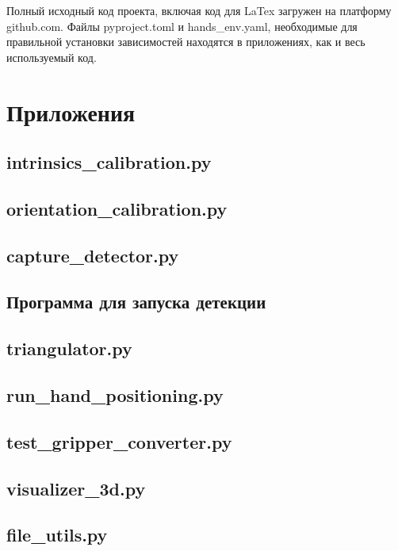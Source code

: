\documentclass[12pt, a4paper]{article}
\begin{document}
Полный исходный код проекта, включая код для LaTex загружен на платформу
github.com\cite{mycode-github}. Файлы pyproject.toml и hands\_env.yaml,
необходимые для правильной установки зависимостей находятся в приложениях, как
и весь используемый код.

\section{Приложения}
\subsection{intrinsics\_calibration.py}



\subsection{orientation\_calibration.py}
 

\subsection{capture\_detector.py}

\subsection{Программа для запуска детекции}


\subsection{triangulator.py}


\subsection{run\_hand\_positioning.py}


\subsection{test\_gripper\_converter.py}


\subsection{visualizer\_3d.py}


\subsection{file\_utils.py}


\printbibliography
% 
% 
  
\end{document}
